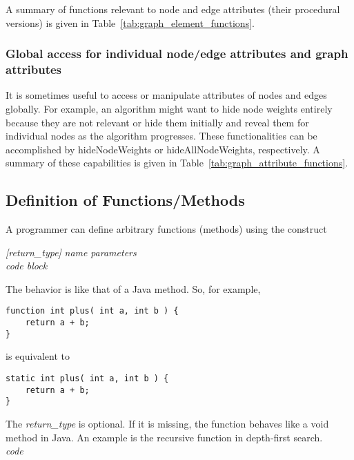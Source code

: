 

A summary of functions relevant to node and edge attributes (their procedural versions)
is given in Table~\ref{tab:graph_element_functions}.

\subsubsection{Global access for individual node/edge attributes and graph attributes}



It is sometimes useful to access or manipulate attributes of nodes and edges
globally.
For example, an algorithm might want to hide node weights entirely
because they are not relevant
or hide them initially and reveal them for individual nodes as
the algorithm progresses.
These functionalities can be accomplished by
\textsf{hideNodeWeights} or \textsf{hideAllNodeWeights}, respectively.
A summary of these capabilities is given in Table~\ref{tab:graph_attribute_functions}.

\subsection{Definition of Functions/Methods}\label{sec:functions}

A programmer can define arbitrary functions (methods) using the construct

 \textsl{[return\_type]} \textsl{name} \Code{(}
 \textsl{parameters} \Code{) \{} \\
 \hspace*{3em} \emph{code block} \\
 \Code{\}}

The behavior is like that of a Java method. So, for example,
\begin{verbatim}
function int plus( int a, int b ) {
    return a + b;
}
\end{verbatim}
is equivalent to
\begin{verbatim}
static int plus( int a, int b ) {
    return a + b;
}
\end{verbatim}

The \textsl{return\_type} is optional. If it is missing, the function behaves like
a \textsf{void} method in Java. An example is the recursive function
 in depth-first search.
\\
 \textsl{code} \Code{\}}

